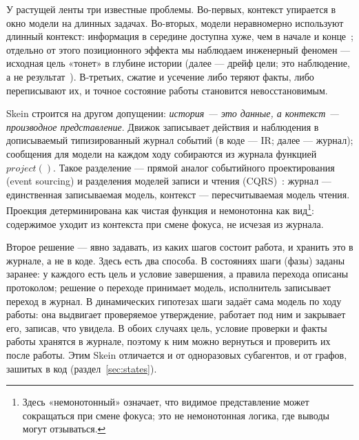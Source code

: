 \documentclass[11pt,a4paper]{article}
\begin{document}
У растущей ленты три известные проблемы. Во-первых, контекст упирается в окно модели на
длинных задачах. Во-вторых, модели неравномерно используют длинный контекст: информация
в середине доступна хуже, чем в начале и конце~\cite{liu2023lost}; отдельно от этого
позиционного эффекта мы наблюдаем инженерный феномен --- исходная цель «тонет» в глубине
истории (далее --- дрейф цели; это наблюдение, а не результат~\cite{liu2023lost}).
В-третьих, сжатие и усечение либо теряют факты, либо переписывают их, и точное состояние
работы становится невосстановимым.

Skein строится на другом допущении: \emph{история --- это данные, а контекст ---
производное представление}. Движок записывает действия и наблюдения в дописываемый
типизированный журнал событий (в коде --- IR; далее --- журнал); сообщения для модели на каждом ходу собираются из журнала функцией
$project()$. Такое разделение --- прямой аналог событийного проектирования (event sourcing)
и разделения моделей записи и чтения (CQRS)~\cite{fowler2005event,fowler2011cqrs}:
журнал --- единственная записываемая модель, контекст --- пересчитываемая модель чтения.
Проекция детерминирована как чистая функция и немонотонна как вид\footnote{Здесь
«немонотонный» означает, что видимое представление может сокращаться при смене фокуса; это
не немонотонная логика, где выводы могут отзываться.}: содержимое уходит из
контекста при смене фокуса, не исчезая из журнала.

Второе решение --- явно задавать, из каких шагов состоит работа, и хранить это в журнале, а не
в коде. Здесь есть два способа. В состояниях шаги (фазы) заданы заранее: у каждого есть цель и
условие завершения, а правила перехода описаны протоколом; решение о переходе принимает
модель, исполнитель записывает переход в журнал. В динамических гипотезах шаги задаёт сама
модель по ходу работы: она выдвигает проверяемое утверждение, работает под ним и закрывает
его, записав, что увидела. В обоих случаях цель, условие проверки и факты работы хранятся в
журнале, поэтому к ним можно вернуться и проверить их после работы. Этим Skein отличается и
от одноразовых субагентов, и от графов, зашитых в код (раздел~\ref{sec:states}).
\end{document}
